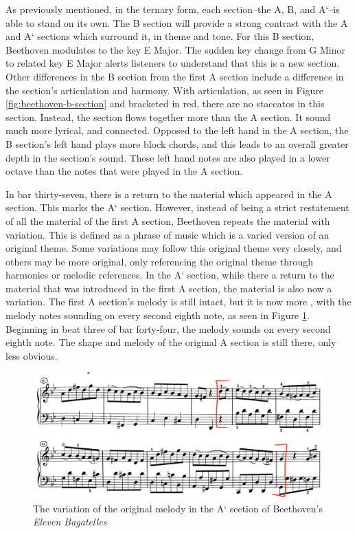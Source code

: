 As previously mentioned, in the ternary form, each section--the A, B, and A`--is able to stand on its own. The B section will provide a strong contrast with the A and A` sections which surround it, in theme and tone. For this B section, Beethoven modulates to the key E\musFlat{} Major. The sudden key change from G Minor to related key E\musFlat{} Major alerts listeners to understand that this is a new section. Other differences in the B section from the first A section include a difference in the section's articulation and harmony. With articulation, as seen in Figure \ref{fig:beethoven-b-section}\autocite{Henle_1978} and bracketed in red, there are no staccatos in this section. Instead, the section flows together more than the A section. It sound much more lyrical, and connected. Opposed to the left hand in the A section, the B section's left hand plays more block chords, and this leads to an overall greater depth in the section's sound. These left hand notes are also played in a lower octave than the notes that were played in the A section. 

In bar thirty-seven, there is a return to the material which appeared in the A section. This marks the A` section. However, instead of being a strict restatement of all the material of the first A section, Beethoven repeats the material with variation. This is defined as a phrase of music which is a varied version of an original theme. Some variations may follow this original theme very closely, and others may be more original, only referencing the original theme through harmonies or melodic references.\autocite{Kennedy_Kennedy_Rutherford-Johnson_2013-variation} In the A` section, while there a return to the material that was introduced in the first A section, the material is also now a variation. The first A section's melody is still intact, but it is now more , with the melody notes sounding on every second eighth note, as seen in Figure \ref{fig:beethoven-a-prime-melody-variation}\autocite{Henle_1978}. Beginning in beat three of bar forty-four, the melody sounds on every second eighth note. The shape and melody of the original A section is still there, only less obvious.

\begin{figure}
	\centering
	\includegraphics[width=\textwidth]{figures/beethoven-a-prime-melody-variation}
	\caption{The variation of the original melody in the A` section of Beethoven's \textit{Eleven Bagatelles}}
	\label{fig:beethoven-a-prime-melody-variation}
\end{figure}